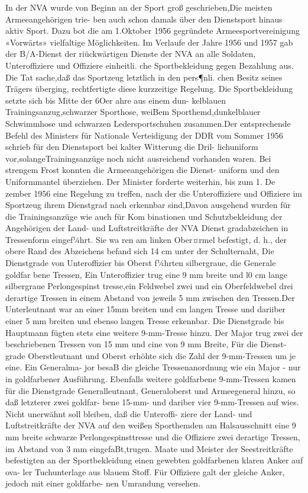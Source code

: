 

In der NVA wurde von Beginn an der Sport groß
geschrieben,Die meisten Armeeangehörigen trie-
ben auch schon damals über den Dienstsport hinaus aktiv Sport. Dazu bot die am 1.Oktober 1956
gegründete Armeesportvereinigung
«Vorwärts»
vielfaltige Möglichkeiten.
Im Verlaufe der Jahre 1956 und 1957 gab der
B/A-Dienst der riückwärtigen Dienste der NVA an
alle Soldaten, Unteroffiziere und Offiziere einheitli.
che Sportbekleidung gegen Bezahlung aus. Die Tat
sache,daß das Sportzeug letztlich in den pers¶nli.
chen Besitz seines Trägers überging, rechtfertigte
diese kurzzeitige Regelung. Die Sportbekleidung
setzte sich bis Mitte der 6Oer ahre aus einem dun-
kelblauen Trainingsanzug,schwarzer Sporthose,
weiBem Sporthemd,dunkelblauer Schwimmhose
und schwarzen Ledersportschuhen zusammen.Der
entsprechende Befehl des Ministers für Nationale
Verteidigung der DDR vom Sommer 1956 schrieb
für den Dienstsport bei kalter Witterung die Dril-
lichuniform vor,solangeTrainingsanzüge noch
nicht ausreichend vorhanden waren. Bei strengem
Frost konnten die Armeeangehörigen die Dienst-
uniform und den Uniformmantel überziehen.
Der Minister forderte weiterhin, bis zum 1. De
zember 1956 eine Regelung zu treffen, nach der die
Unteroffiziere und Offiziere im Sportzeug ihrem
Dienstgrad nach erkennbar sind,Davon ausgehend
wurden für die Trainingsanzüge wie auch für Kom
binationen und Schutzbekleidung der Angehörigen
der Land- und Luftstreitkräfte der NVA Dienst
gradabzeichen in Tressenform eingef¼hrt. Sie wa
ren am linken Ober¤rmel befestigt, d. h., der obere
Rand des Abzeichens befand sich 14 cm unter der
Schulternaht, Die Dienstgrade von Unteroffizier bis
Oberst f¼hrten silbergraue, die Generale goldfar
bene Tressen, Ein Unteroffizier trug eine 9 mm
breite und l0 cm lange silbergraue Perlongespinst
tresse,ein Feldwebel zwei und ein Oberfeldwebel
drei derartige Tressen in einem Abstand von jeweils
5 mm zwischen den Tressen.Der Unterleutnant war
an einer 15mm breiten und cm langen Tresse
und dariiber einer 5 mm breiten und ebenso langen
Tresse erkennbar. Die Dienstgrade bis Hauptmann
fügten stets eine weitere 9-mm-Tresse hinzu. Der
Major trug zwei der beschriebenen Tressen von 15 mm und cine von 9 mm Breite, Für die Dienst-
grade Oberstleutnant und Oberst erhöhte sich die
Zahl der 9-mm-Tressen um je eine. Ein Generalma-
jor besaB die gleiche Tressenanordnung wie ein
Major - nur in goldfarbener Ausführung. Ebenfalls
weitere goldfarbene 9-mm-Tressen kamen für die
Dienstgrade Generalleutnant, Generaloberst und
Armeegeneral hinzu, so daß letzterer zwei goldfar-
bene 15-mm- und dariber vier 9-mm-Tressen auf
wies.
Nicht unerwähnt soll bleiben, daß die Unteroffi-
ziere der Land- und Luftstreitkräfte der NVA auf
den weißen Sporthemden am Halsausschnitt eine
9 mm breite schwarze Perlongespinsttresse und die
Offiziere zwei derartige Tressen, im Abstand von
3 mm eingefaBt,trugen. Maate und Meister der
Seestreitkräfte befestigten an der Sportbekleidung
einen gewebten goldfarbenen klaren Anker auf ova-
ler Tuchunterlage aus blauem Stoff. Für Offiziere
galt der gleiche Anker, jedoch mit einer goldfarbe-
nen Umrandung versehen.